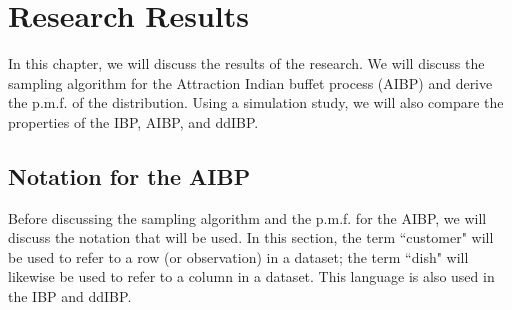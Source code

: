 \chapter{Research Results}
In this chapter, we will discuss the results of the research. We will discuss
the sampling algorithm for the Attraction Indian buffet process (AIBP) and
derive the p.m.f. of the distribution. Using a simulation study, we will also
compare the properties of the IBP, AIBP, and ddIBP.

\section{Notation for the AIBP}
Before discussing the sampling algorithm and the p.m.f. for the AIBP,  we will 
discuss the notation that will be used. In this section, the term ``customer" will
be used to refer to a row (or observation) in a dataset; the term ``dish" will
likewise be used to refer to a column in a dataset. This language is also used in
the IBP and ddIBP.

